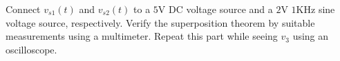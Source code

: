 \documentclass[11pt]{article}
\begin{document}
\begin{question}
    \begin{subquestion}{Connect $v_{s1}(t)$ and $v_{s2}(t)$ to a $5$V DC voltage source and a $2$V $1$KHz sine voltage source, respectively. Verify the superposition theorem by suitable measurements using a multimeter. Repeat this part while seeing $v_3$ using an oscilloscope.}
\end{subquestion}
\end{question}
\end{document}
